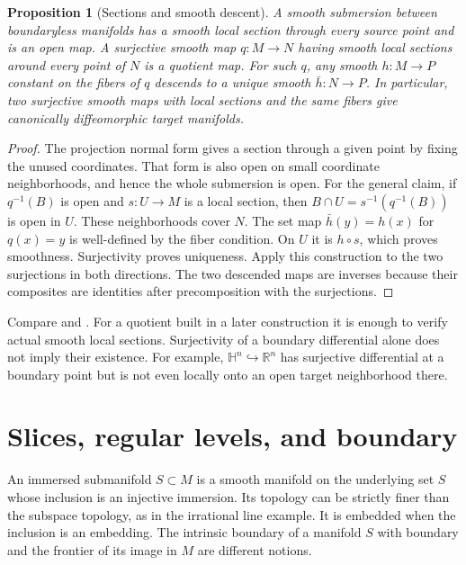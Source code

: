 \documentclass[11pt,oneside,openany]{book}
\newtheorem{proposition}[theorem]{Proposition}
\theoremstyle{definition}
\theoremstyle{remark}
\newcommand{\R}{\mathbb R}
\newcommand{\HH}{\mathbb H}
\begin{document}
\begin{proposition}[Sections and smooth descent]\label{p104:M03.03}
A smooth submersion between boundaryless manifolds has a
smooth local section through every source point and is an
open map. A surjective smooth map \(q:M\to N\) having
smooth local sections around every point of \(N\) is a
quotient map. For such \(q\), any smooth \(h:M\to P\)
constant on the fibers of \(q\) descends to a unique
smooth \(\bar h:N\to P\). In particular, two surjective
smooth maps with local sections and the same fibers give
canonically diffeomorphic target manifolds.
\end{proposition}

\begin{proof}
The projection normal form gives a section through a
given point by fixing the unused coordinates. That form
is also open on small coordinate neighborhoods, and hence
the whole submersion is open. For the general claim, if
\(q^{-1}(B)\) is open and \(s:U\to M\) is a local section,
then \(B\cap U=s^{-1}(q^{-1}(B))\) is open in \(U\).
These neighborhoods cover \(N\). The set map
\(\bar h(y)=h(x)\) for \(q(x)=y\) is well-defined by the
fiber condition. On \(U\) it is \(h\circ s\), which
proves smoothness. Surjectivity proves uniqueness.
Apply this construction to the two surjections in
both directions. The two descended maps are inverses
because their composites are identities after
precomposition with the surjections.
\end{proof}

Compare \cite[pp.~85--91]{lee} and \cite[Sections~7 and 11]{tu}.
For a quotient built in a later construction it is enough
to verify actual smooth local sections. Surjectivity of
a boundary differential alone does not imply their
existence. For example, \(\HH^n\hookrightarrow\R^n\) has
surjective differential at a boundary point but is
not even locally onto an open target neighborhood there.

\section{Slices, regular levels, and boundary}

An immersed submanifold \(S\subset M\) is a smooth
manifold on the underlying set \(S\) whose inclusion is
an injective immersion. Its topology can be strictly
finer than the subspace topology, as in the irrational
line example. It is embedded when the inclusion is an
embedding. The intrinsic boundary of a manifold \(S\)
with boundary and the frontier of its image in \(M\)
are different notions.
\end{document}
